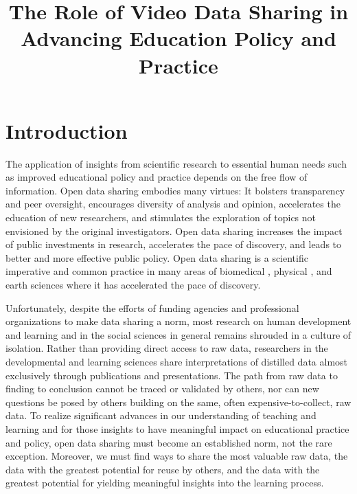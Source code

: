 \documentclass[letterpaper,man,apacite]{apa6}
\title{The Role of Video Data Sharing in Advancing Education Policy and Practice}
\begin{document}
\maketitle

\section{Introduction}

The application of insights from scientific research to essential human needs such as improved educational policy and practice depends on the free flow of information. 
Open data sharing embodies many virtues: It bolsters transparency and peer oversight, encourages diversity of analysis and opinion, accelerates the education of new researchers, and stimulates the exploration of topics not envisioned by the original investigators.
Open data sharing increases the impact of public investments in research, accelerates the pace of discovery, and leads to better and more effective public policy.
Open data sharing is a scientific imperative \cite{NSF2011,NIMH2015} and common practice in many areas of biomedical \cite{Kaye2009}, physical \cite{Young2011}, and earth sciences \cite{Kleiner2011} where it has accelerated the pace of discovery.

Unfortunately, despite the efforts of funding agencies and professional organizations \cite{AERA-Code-2011} to make data sharing a norm, most research on human development and learning \cite{Adolph2012} and in the social sciences in general \cite{Nosek2012} remains shrouded in a culture of isolation. 
Rather than providing direct access to raw data, researchers in the developmental and learning sciences share interpretations of distilled data almost exclusively through publications and presentations.
The path from raw data to finding to conclusion cannot be traced or validated by others, nor can new questions be posed by others building on the same, often expensive-to-collect, raw data.
To realize significant advances in our understanding of teaching and learning and for those insights to have meaningful impact on educational practice and policy, open data sharing must become an established norm, not the rare exception.
Moreover, we must find ways to share the most valuable raw data, the data with the greatest potential for reuse by others, and the data with the greatest potential for yielding meaningful insights into the learning process.
\end{document}
